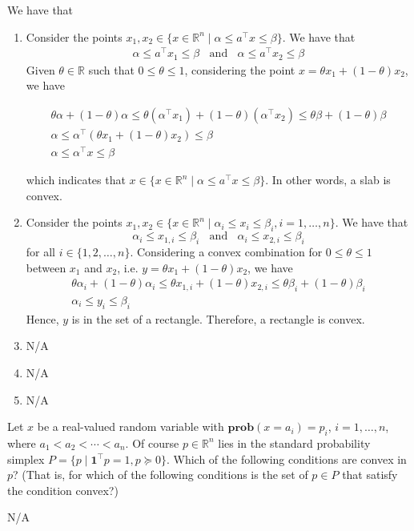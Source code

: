 \documentclass{llncs}
\newcommand{\pn}[1]{\left(#1\right)}
\begin{document}
\begin{solution} We have that 
\begin{enumerate}
    \item Consider the points $x_1, x_2 \in \{x \in \mathbb{R}^n \mid \alpha \le a^\top x \le \beta\}$. We have that
    \begin{align*}
    		\alpha \le a^\top x_1 \le \beta  ~~~~\text{and}~~~~ \alpha \le a^\top x_2 \le \beta 
    \end{align*}
    Given $\theta \in \mathbb{R}$ such that $0 \le \theta \le 1$, considering the point $x = \theta x_1 + \pn{1 - \theta}x_2$, we have
    \begin{center}
    \begin{align*}
    		\theta\alpha + \pn{1 - \theta}\alpha \le \theta\pn{\alpha^\top x_1} + \pn{1 - \theta}\pn{\alpha^\top x_2} \le \theta\beta + \pn{1 - \theta}\beta \\
    		\alpha \le \alpha^\top \pn{\theta x_1 + \pn{1-\theta}x_2} \le \beta \\
    		\alpha \le \alpha^\top x \le \beta 
			\end{align*}
    	\end{center}
    	which indicates that $x \in \{x \in \mathbb{R}^n \mid \alpha \le a^\top x \le \beta\}$. In other words, a slab is convex.
    \item Consider the points $x_1, x_2 \in \{x \in \mathbb{R}^n \mid \alpha_i \le x_i \le \beta_i, i = 1, \ldots, n\}$. We have that
			\[
					\alpha_i \le x_{1,i} \le \beta_i ~~~~\text{and}~~~~ \alpha_i \le x_{2,i} \le \beta_i 
			\]
			for all $i \in \{1,2,\ldots,n\}$. Considering a convex combination for $0 \le \theta \le 1$ between $x_1$ and $x_2$, i.e. $y = \theta x_1 + \pn{1-\theta}x_2$, we have
			\begin{align*}
				\theta \alpha_i + \pn{1-\theta} \alpha_i \le \theta x_{1,i} + \pn{1-\theta}x_{2,i} \le \theta \beta_i + \pn{1 - \theta}\beta_i \\
				\alpha_i \le y_i \le \beta_i
			\end{align*}
			Hence, $y$ is in the set of a rectangle. Therefore, a rectangle is convex.
			\item N/A
			\item N/A
			\item N/A
\end{enumerate}
\end{solution}

\begin{problem}
Let $x$ be a real-valued random variable with $\textbf{prob}(x = a_i) = p_i$, $i = 1, \ldots, n$, where $a_1 < a_2 < \cdots < a_n$. Of course $p \in \mathbb{R}^n$ lies in the standard probability simplex $P = \{ p \mid \mathbf{1}^\top p = 1, p \succeq 0\}$. Which of the following conditions are convex in $p$? (That is, for which of the following conditions is the set of $p \in P$ that satisfy the condition convex?)
\end{problem}
\begin{solution}
N/A
\end{solution}
\end{document}
